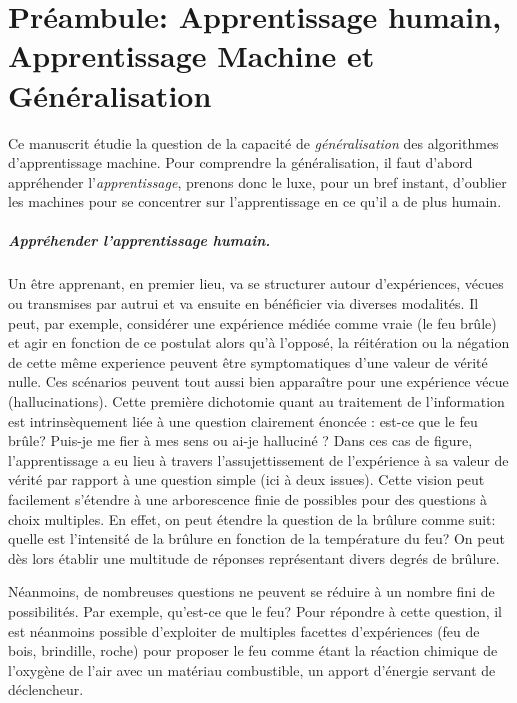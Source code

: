 \chapter*{Préambule: Apprentissage humain, Apprentissage Machine et Généralisation}
\mtcaddchapter


Ce manuscrit étudie la question de la capacité de \emph{généralisation} des algorithmes d'apprentissage machine. Pour comprendre la généralisation, il faut d'abord appréhender l'\emph{apprentissage}, prenons donc le luxe, pour un bref instant, d'oublier les machines pour se concentrer sur l'apprentissage en ce qu'il a de plus humain.

\paragraph{Appréhender l'apprentissage humain.}
Un être apprenant, en premier lieu, va se structurer autour d'expériences, vécues ou transmises par autrui et va ensuite en bénéficier via diverses modalités. Il peut, par exemple, considérer une expérience médiée comme vraie (le feu brûle) et agir en fonction de ce postulat alors qu'à l'opposé, la réitération ou la négation de cette même experience peuvent être symptomatiques d'une valeur de vérité nulle. Ces scénarios peuvent tout aussi bien apparaître pour une expérience vécue (hallucinations). Cette première dichotomie quant au traitement de l'information est intrinsèquement liée à une question clairement énoncée : est-ce que le feu brûle? Puis-je me fier à mes sens ou ai-je halluciné ? Dans ces cas de figure, l'apprentissage a eu lieu à travers l'assujettissement de l'expérience à sa valeur de vérité par rapport à une question simple (ici à deux issues).  Cette vision peut facilement s'étendre à une arborescence finie de possibles pour des questions à choix multiples. En effet, on peut étendre la question de la brûlure comme suit: quelle est l'intensité de la brûlure en fonction de la température du feu? On peut dès lors établir une multitude de réponses représentant divers degrés de brûlure.
  
 Néanmoins, de nombreuses questions ne peuvent se réduire à un nombre fini de possibilités. Par exemple, qu'est-ce que le feu? Pour répondre à cette question, il est néanmoins possible d'exploiter de multiples facettes d'expériences (feu de bois, brindille, roche) pour proposer le feu comme étant la réaction chimique de l'oxygène de l'air avec un matériau combustible, un apport d'énergie servant de déclencheur. 

